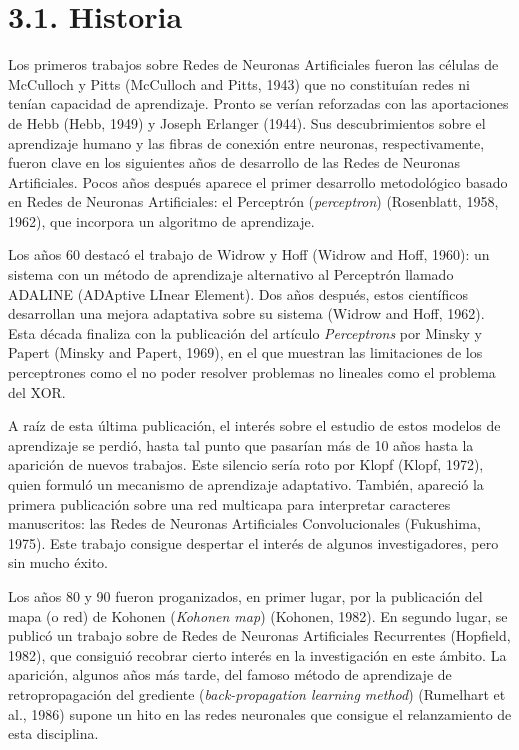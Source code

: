 \documentclass[spanish,a4paper,12pt,twoside]{report}
\begin{document}
    \section*{\Large 3.1. Historia}
    Los primeros trabajos sobre Redes de Neuronas Artificiales fueron las células de McCulloch y Pitts (McCulloch and Pitts, 1943) que no constituían redes ni tenían capacidad de aprendizaje. Pronto se verían reforzadas con las aportaciones de Hebb (Hebb, 1949) y Joseph Erlanger (1944). Sus descubrimientos sobre el aprendizaje humano y las fibras de conexión entre neuronas, respectivamente, fueron clave en los siguientes años de desarrollo de las Redes de Neuronas Artificiales. Pocos años después aparece el primer desarrollo metodológico basado en Redes de Neuronas Artificiales: el Perceptrón (\emph{perceptron}) (Rosenblatt, 1958, 1962), que incorpora un algoritmo de aprendizaje. \par
    Los años 60 destacó el trabajo de Widrow y Hoff (Widrow and Hoff, 1960): un sistema con un método de aprendizaje alternativo al Perceptrón llamado ADALINE (ADAptive LInear Element). Dos años después, estos científicos desarrollan una mejora adaptativa sobre su sistema (Widrow and Hoff, 1962). Esta década finaliza con la publicación del artículo \emph{Perceptrons} por Minsky y Papert (Minsky and Papert, 1969), en el que muestran las limitaciones de los perceptrones como el no poder resolver problemas no lineales como el problema del XOR. \par
    A raíz de esta última publicación, el interés sobre el estudio de estos modelos de aprendizaje se perdió, hasta tal punto que pasarían más de 10 años hasta la aparición de nuevos trabajos. Este silencio sería roto por Klopf (Klopf, 1972), quien formuló un mecanismo de aprendizaje adaptativo. También, apareció la primera publicación sobre una red multicapa para interpretar caracteres manuscritos: las Redes de Neuronas Artificiales Convolucionales (Fukushima, 1975). Este trabajo consigue despertar el interés de algunos investigadores, pero sin mucho éxito. \par
    Los años 80 y 90 fueron proganizados, en primer lugar, por la publicación del mapa (o red) de Kohonen (\emph{Kohonen map}) (Kohonen, 1982). En segundo lugar, se publicó un trabajo sobre de Redes de Neuronas Artificiales Recurrentes (Hopfield, 1982), que consiguió recobrar cierto interés en la investigación en este ámbito. La aparición, algunos años más tarde, del famoso método de aprendizaje de retropropagación del grediente (\emph{back-propagation learning method}) (Rumelhart et al., 1986) supone un hito en las redes neuronales que consigue el relanzamiento de esta disciplina.
\end{document}
